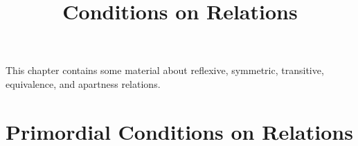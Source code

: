 

%



\title{Conditions on Relations}

\maketitle

\label{section-phantom}

This chapter contains some material about reflexive, symmetric, transitive, equivalence, and apartness relations.

\ChapterTableOfContents

\section{Primordial Conditions on Relations}\label{section-primordial-conditions-on-relations}
